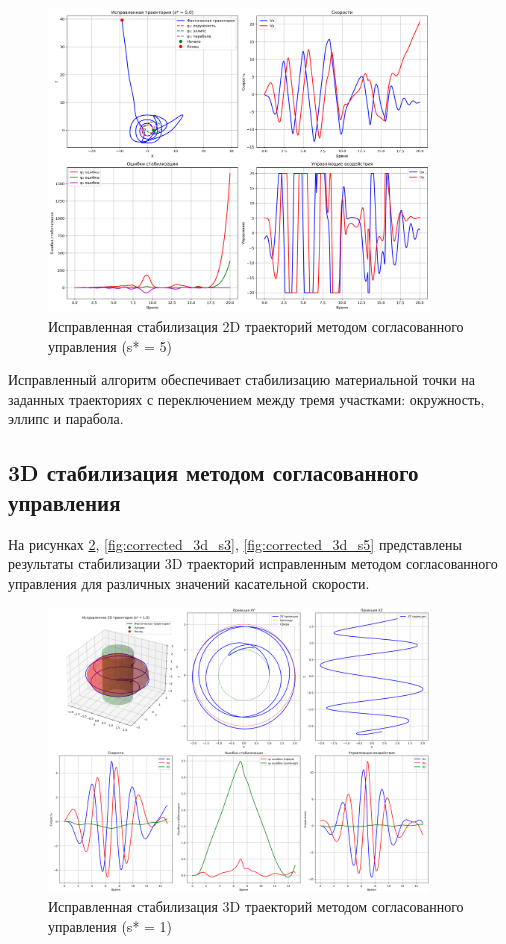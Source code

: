 \begin{figure}[H]
\centering
\includegraphics[width=0.9\textwidth]{images/task1/corrected_2d_s5.0.png}
\caption{Исправленная стабилизация 2D траекторий методом согласованного управления (s* = 5)}
\label{fig:corrected_2d_s5}
\end{figure}

Исправленный алгоритм обеспечивает стабилизацию материальной точки на заданных траекториях с переключением между тремя участками: окружность, эллипс и парабола.

\subsection{3D стабилизация методом согласованного управления}

На рисунках \ref{fig:corrected_3d_s1}, \ref{fig:corrected_3d_s3}, \ref{fig:corrected_3d_s5} представлены результаты стабилизации 3D траекторий исправленным методом согласованного управления для различных значений касательной скорости.

\begin{figure}[H]
\centering
\includegraphics[width=0.9\textwidth]{images/task2/corrected_3d_s1.0.png}
\caption{Исправленная стабилизация 3D траекторий методом согласованного управления (s* = 1)}
\label{fig:corrected_3d_s1}
\end{figure}

